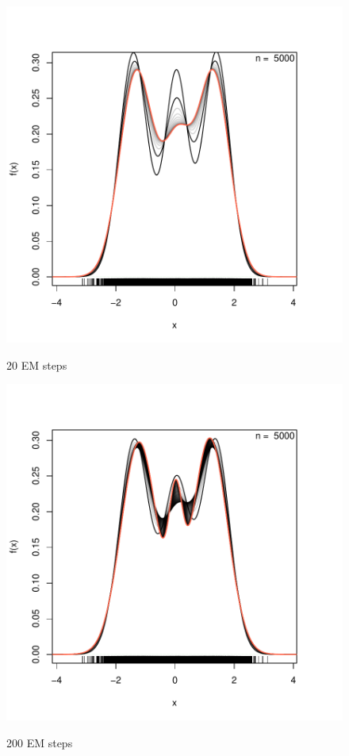 \begin{figure}[h]
    \begin{Rgraph}[0.9]
\includegraphics{chapter1-fignor1mixEx}
    \label{fig:20em}
    \caption{20 EM steps}
    \end{Rgraph}
\end{figure}

\begin{figure}[h]
    \begin{Rgraph}[0.9]
\includegraphics{chapter1-figplotemsteps}
    \label{fig:200em}
    \caption{200 EM steps}
    \end{Rgraph}
\end{figure}

